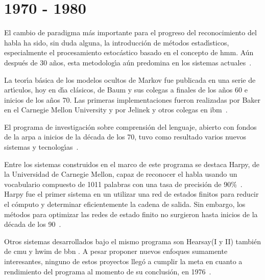 \section{1970 - 1980}
\label{sec:70s}

El cambio de paradigma m\'as importante para el progreso del reconocimiento del habla ha sido, sin duda alguna,
la introducci\'on de m\'etodos estad{\'\i}sticos, especialmente el procesamiento estoc\'astico basado en el
concepto de \gls{hmm}. A\'un despu\'es de 30 a\~nos, esta metodolog{\'\i}a a\'un predomina en los
sistemas \mbox{actuales \cite{BakerResearch2009}}.

La teor{\'\i}a b\'asica de los modelos ocultos de Markov fue publicada en una serie de art{\'\i}culos, 
hoy en d{\'\i}a cl\'asicos, de Baum y sus colegas a finales de los a\~nos 60 e inicios de los a\~nos 70. 
Las primeras implementaciones fueron realizadas por Baker en el Carnegie Mellon University 
y por Jelinek y otros colegas en \mbox{\gls{ibm} \cite{Rabiner89atutorial}}.

El programa de investigaci\'on sobre comprensi\'on del lenguaje, abierto con fondos de la \gls{arpa} 
a inicios de la d\'ecada de los 70, tuvo como resultado varios nuevos sistemas y 
\mbox{tecnolog{\'\i}as \cite{Furui50Years2004}}.

Entre los sistemas construidos en el marco de este programa se destaca Harpy, de la Universidad de Carnegie Mellon,
capaz de reconocer el habla usando un vocabulario compuesto de 1011 palabras con una tasa de 
precisi\'on de \mbox{90\% \cite{Newell1978}.} Harpy fue el primer sistema en un utilizar una red de estados finitos
para reducir el c\'omputo y determinar eficientemente la cadena de salida. 
Sin embargo, los m\'etodos para optimizar las redes de estado finito no surgieron hasta inicios de
la d\'ecada de los \mbox{90 \cite{JuangAutomaticSpeech}}.

Otros sistemas desarrollados bajo el mismo programa son Hearsay(I y II) tambi\'en de \gls{cmu} y \gls{hwim} 
de \gls{bbn} \cite{JuangAutomaticSpeech}. A pesar proponer nuevos enfoques sumamente interesantes, 
ninguno de estos proyectos lleg\'o a cumplir la meta en cuanto a rendimiento
del programa al momento de su conclusi\'on, en \mbox{1976 \cite{JuangAutomaticSpeech}}.